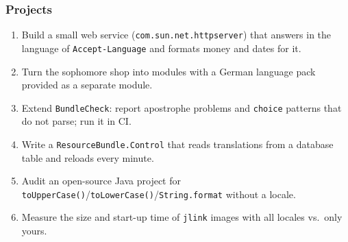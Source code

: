 \documentclass[aspectratio=169,10pt,compress]{beamer}
\begin{document}
\begin{frame}[t,fragile] \frametitle{Projects}
  \begin{enumerate}\small
    \item Build a small web service (\texttt{com.sun.net.httpserver}) that answers in the language of
      \texttt{Accept-Language} and formats money and dates for it.
    \item Turn the sophomore shop into modules with a German language pack provided as a separate module.
    \item Extend \texttt{BundleCheck}: report apostrophe problems and \texttt{choice} patterns that do not parse; run it in CI.
    \item Write a \texttt{ResourceBundle.Control} that reads translations from a database table and reloads every minute.
    \item Audit an open-source Java project for \texttt{toUpperCase()}/\texttt{toLowerCase()}/\texttt{String.format} without a locale.
    \item Measure the size and start-up time of \texttt{jlink} images with all locales vs.\ only yours.
  \end{enumerate}
\end{frame}




\begin{frame}[t,fragile]
	\begin{center}
		\vspace{4cm}
	\end{center}
\end{frame}
\end{document}
